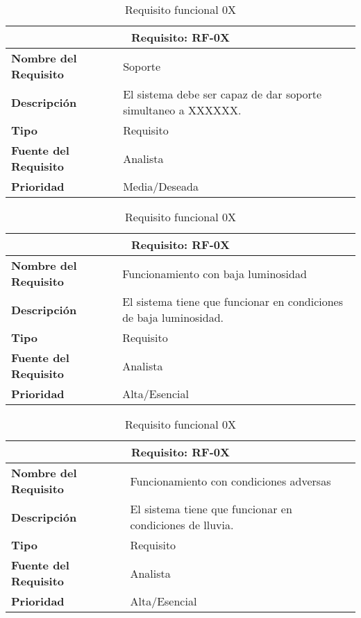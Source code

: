 \documentclass[10pt,a4paper,oldfontcommands]{dpds}
\begin{document}
\begin{table}[H]
\begin{center}
\begin{tabular}{p{} p{7cm}}
\multicolumn{2}{c}{\textbf{Requisito: RF-0X} } \\
\hline \hline
\textbf{Nombre del Requisito} & Soporte\\
\textbf{Descripción} & El sistema debe ser capaz de dar soporte simultaneo a XXXXXX.\\
\textbf{Tipo} & Requisito  \\
\textbf{Fuente del Requisito} & Analista  \\
\textbf{Prioridad} & Media/Deseada \\ \hline
\end{tabular}
\caption{Requisito funcional 0X}
\label{tab:personal}
\end{center}
\end{table}

\begin{table}[H]
\begin{center}
\begin{tabular}{p{} p{7cm}}
\multicolumn{2}{c}{\textbf{Requisito: RF-0X} } \\
\hline \hline
\textbf{Nombre del Requisito} & Funcionamiento con baja luminosidad\\
\textbf{Descripción} & El sistema tiene que funcionar en condiciones de baja luminosidad.\\
\textbf{Tipo} & Requisito  \\
\textbf{Fuente del Requisito} & Analista  \\
\textbf{Prioridad} & Alta/Esencial \\ \hline
\end{tabular}
\caption{Requisito funcional 0X}
\label{tab:personal}
\end{center}
\end{table}

\begin{table}[H]
\begin{center}
\begin{tabular}{p{} p{7cm}}
\multicolumn{2}{c}{\textbf{Requisito: RF-0X} } \\
\hline \hline
\textbf{Nombre del Requisito} & Funcionamiento con condiciones adversas\\
\textbf{Descripción} & El sistema tiene que funcionar en condiciones de lluvia.\\
\textbf{Tipo} & Requisito  \\
\textbf{Fuente del Requisito} & Analista  \\
\textbf{Prioridad} & Alta/Esencial \\ \hline
\end{tabular}
\caption{Requisito funcional 0X}
\label{tab:personal}
\end{center}
\end{table}
\end{document}
